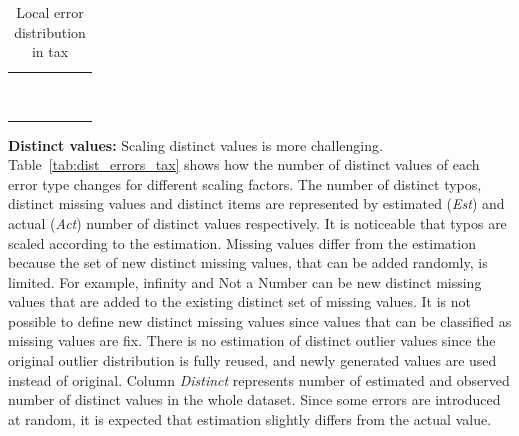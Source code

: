 \begin{table}[!t]
\caption{\label{tab:local_errors_tax} Local error distribution in tax}
\centering
\begin{tabular}{r|K|K|K|K|K}
\toprule
{} &  &  &  &  &   \\ \midrule
   &    &    &     &     &     \\
   &    &    &    &     &     \\
   &    &    &    &     &    \\
   &   &   &    &     &    \\
  &   &   &    &    &    \\
  &   &   &   &    &   \\
  &  &   &   &    &   \\
 &  &  &   &   &   \\
 &  &  &  &   &  \\
\bottomrule
\end{tabular}
\end{table}

\textbf{Distinct values:} 
Scaling distinct values is more challenging. 
Table~\ref{tab:dist_errors_tax} shows how the number of distinct values of each error type changes for different scaling factors.
The number of distinct typos, distinct missing values and distinct items are represented by estimated (\textit{Est}) and actual (\textit{Act}) number of distinct values respectively.
It is noticeable that typos are scaled according to the estimation.
Missing values differ from the estimation because the set of new distinct missing values, that can be added randomly, is limited.
For example, infinity and Not a Number can be new distinct missing values that are added to the existing distinct set of missing values.
It is not possible to define new distinct missing values since values that can be classified as missing values are fix.
There is no estimation of distinct outlier values since the original outlier distribution is fully reused, and newly generated values are used instead of original. 
Column \textit{Distinct} represents number of estimated and observed number of distinct values in the whole dataset.
Since some errors are introduced at random, it is expected that estimation slightly differs from the actual value. 

